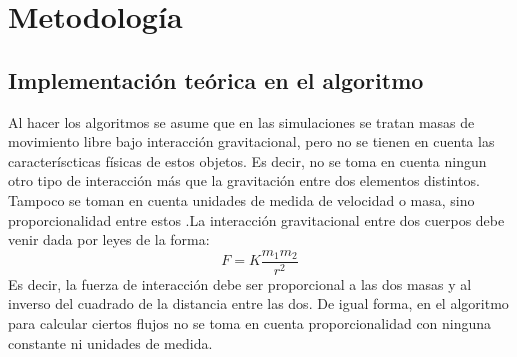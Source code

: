 \documentclass[12pt]{article}
\begin{document}
\section{Metodología}

\subsection{Implementación teórica en el algoritmo}
Al hacer los algoritmos se asume que en las simulaciones \cite{simulations} se tratan masas de movimiento libre bajo interacción gravitacional, pero no se tienen en cuenta las caracteríscticas físicas de estos objetos. Es decir, no se toma en cuenta ningun otro tipo de interacción más que la gravitación entre dos elementos distintos. 
Tampoco se toman en cuenta unidades de medida de velocidad o masa, sino proporcionalidad entre estos .La interacción gravitacional entre dos cuerpos debe venir dada por leyes de la forma:
\begin{equation}
F= K \frac{m_1 m_2}{r^2}
\end{equation}
Es decir, la fuerza de interacción debe ser proporcional a las dos masas y al inverso del cuadrado de la distancia entre las dos. De igual forma, en el algoritmo para calcular ciertos flujos no se toma en cuenta proporcionalidad con ninguna constante ni unidades de medida.\\
\end{document}
